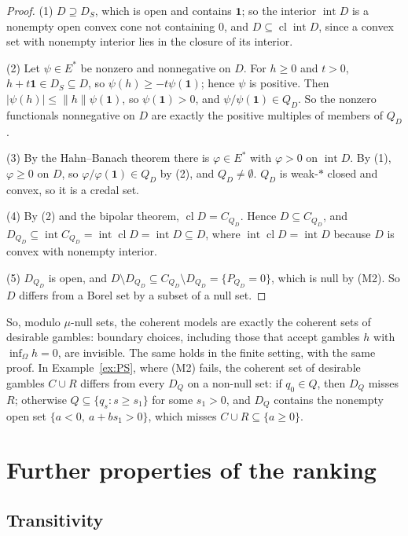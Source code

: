 \documentclass[11pt]{article}
\newcommand{\one}{\mathbf{1}}
\DeclareMathOperator{\cl}{cl}
\DeclareMathOperator{\inter}{int}
\theoremstyle{plain}
\theoremstyle{definition}
\theoremstyle{remark}
\begin{document}
\begin{proof}
(1) $D\supseteq D_S$, which is open and contains $\one$; so the interior $\inter D$ is a
nonempty open convex cone not containing $0$, and $D\subseteq\cl\inter D$, since a convex set
with nonempty interior lies in the closure of its interior.

(2) Let $\psi\in E^\ast$ be nonzero and nonnegative on $D$. For $h\ge0$ and $t>0$,
$h+t\one\in D_S\subseteq D$, so $\psi(h)\ge-t\psi(\one)$; hence $\psi$ is positive. Then
$|\psi(h)|\le\|h\|\psi(\one)$, so $\psi(\one)>0$, and $\psi/\psi(\one)\in Q_D$. So the
nonzero functionals nonnegative on $D$ are exactly the positive multiples of members of
$Q_D$.

(3) By the Hahn--Banach theorem there is $\varphi\in E^\ast$ with $\varphi>0$ on $\inter D$.
By (1), $\varphi\ge0$ on $D$, so $\varphi/\varphi(\one)\in Q_D$ by (2), and $Q_D\ne
\emptyset$. $Q_D$ is weak-$\ast$ closed and convex, so it is a credal set.

(4) By (2) and the bipolar theorem, $\cl D=C_{Q_D}$. Hence $D\subseteq C_{Q_D}$, and
$D_{Q_D}\subseteq\inter C_{Q_D}=\inter\cl D=\inter D\subseteq D$, where $\inter\cl D=
\inter D$ because $D$ is convex with nonempty interior.

(5) $D_{Q_D}$ is open, and $D\setminus D_{Q_D}\subseteq C_{Q_D}\setminus D_{Q_D}=\{P_{Q_D}
=0\}$, which is null by (M2). So $D$ differs from a Borel set by a subset of a null set.
\end{proof}

So, modulo $\mu$-null sets, the coherent models are exactly the coherent sets of desirable
gambles: boundary choices, including those that accept gambles $h$ with $\inf_\Omega h=0$,
are invisible. The same holds in the finite setting, with the same proof. In
Example~\ref{ex:PS}, where (M2) fails, the coherent set of desirable gambles $C\cup R$
differs from every $D_Q$ on a non-null set: if $q_0\in Q$, then $D_Q$ misses $R$; otherwise
$Q\subseteq\{q_s:s\ge s_1\}$ for some $s_1>0$, and $D_Q$ contains the nonempty open set
$\{a<0,\ a+bs_1>0\}$, which misses $C\cup R\subseteq\{a\ge0\}$.

\section{Further properties of the ranking}\label{sec:further}

\subsection{Transitivity}
\end{document}
